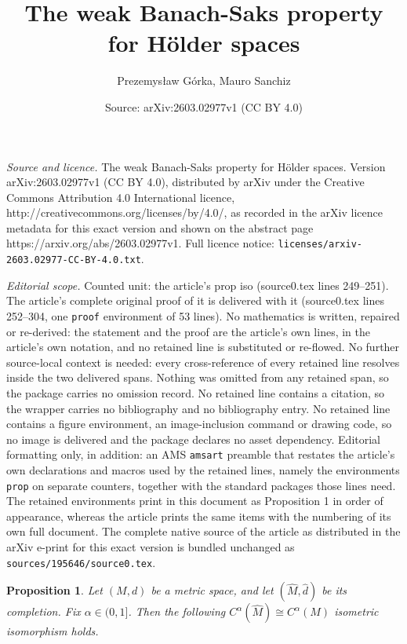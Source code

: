 \documentclass[10pt,a4paper]{amsart}
\title{The weak Banach-Saks property for Hölder spaces}
\author{Prezemys{\l}aw G\'orka, Mauro Sanchiz}
\date{Source: arXiv:2603.02977v1 (CC BY 4.0)}
\newtheorem{prop}{Proposition}
\begin{document}
\maketitle

\noindent\emph{Source and licence.} The weak Banach-Saks property for Hölder spaces. Version arXiv:2603.02977v1 (CC BY 4.0), distributed by arXiv under the Creative Commons Attribution 4.0 International licence, http://creativecommons.org/licenses/by/4.0/, as recorded in the arXiv licence metadata for this exact version and shown on the abstract page https://arxiv.org/abs/2603.02977v1. Full licence notice: \texttt{licenses/arxiv-2603.02977-CC-BY-4.0.txt}.\par\smallskip

\noindent\textit{Editorial scope.} Counted unit: the article's prop iso (source0.tex lines 249--251). The article's complete original proof of it is delivered with it (source0.tex lines 252--304, one \texttt{proof} environment of 53 lines). No mathematics is written, repaired or re-derived: the statement and the proof are the article's own lines, in the article's own notation, and no retained line is substituted or re-flowed.  No further source-local context is needed: every cross-reference of every retained line resolves inside the two delivered spans.  Nothing was omitted from any retained span, so the package carries no omission record.  No retained line contains a citation, so the wrapper carries no bibliography and no bibliography entry.  No retained line contains a figure environment, an image-inclusion command or drawing code, so no image is delivered and the package declares no asset dependency.  Editorial formatting only, in addition: an AMS \texttt{amsart} preamble that restates the article's own declarations and macros used by the retained lines, namely the environments \texttt{prop} on separate counters, together with the standard packages those lines need.  The retained environments print in this document as Proposition 1 in order of appearance, whereas the article prints the same items with the numbering of its own full document.  The complete native source of the article as distributed in the arXiv e-print for this exact version is bundled unchanged as \texttt{sources/195646/source0.tex}.
\begin{prop} \label{iso}
    Let $(M,d)$ be a metric space, and let $(\widehat{M},\widehat{d})$ be its completion. Fix $\alpha \in (0,1]$. Then the following $C^\alpha(\widehat{M}) \cong C^\alpha(M)$ isometric isomorphism holds.
\end{prop}
\end{document}
